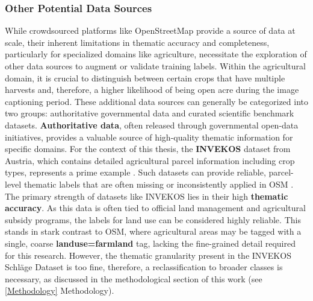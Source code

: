 \documentclass{report}
\begin{document}
\subsubsection{Other Potential Data Sources}
While crowdsourced platforms like OpenStreetMap provide a source of data at scale, their inherent limitations in thematic accuracy and completeness, particularly for specialized domains like agriculture, necessitate the exploration of other data sources to augment or validate training labels. Within the agricultural domain, it is crucial to distinguish between certain crops that have multiple harvests and, therefore, a higher likelihood of being open acre during the image captioning period. These additional data sources can generally be categorized into two groups: authoritative governmental data and curated scientific benchmark datasets.
\textbf{Authoritative data}, often released through governmental open-data initiatives, provides a valuable source of high-quality thematic information for specific domains. For the context of this thesis, the \textbf{INVEKOS} dataset from Austria, which contains detailed agricultural parcel information including crop types, represents a prime example \parencites[]{AgrarmarktAustriaINVEKOSSchlageOsterreich2024}. Such datasets can provide reliable, parcel-level thematic labels that are often missing or inconsistently applied in OSM \parencites[p.~5]{UsmaniEtAlRemoteSensingDeepLearningUnderstandNoisyOpenStreetMap2023}. The primary strength of datasets like INVEKOS lies in their high \textbf{thematic accuracy}. As this data is often tied to official land management and agricultural subsidy programs, the labels for land use can be considered highly reliable. This stands in stark contrast to OSM, where agricultural areas may be tagged with a single, coarse \textbf{landuse=farmland} tag, lacking the fine-grained detail required for this research. However, the thematic granularity present in the INVEKOS Schläge Dataset is too fine, therefore, a reclassification to broader classes is necessary, as discussed in the methodological section of this work (see \ref{Methodology} Methodology). 
\end{document}
